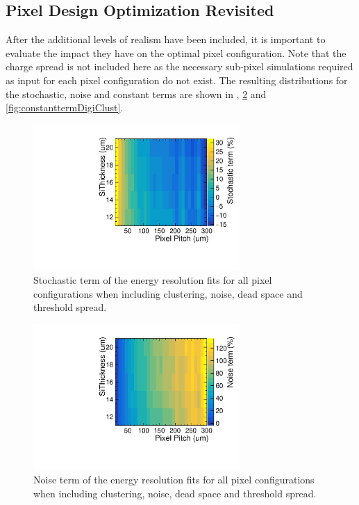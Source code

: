\subsection{Pixel Design Optimization Revisited}

After the additional levels of realism have been included, it is important to evaluate the impact they have on the optimal pixel configuration. Note that the charge spread is not included here as the necessary sub-pixel simulations required as input for each pixel configuration do not exist. The resulting distributions for the stochastic, noise and constant terms are shown in  , \ref{fig:noisetermDigiClust} and \ref{fig:constanttermDigiClust}.

\begin{figure}
  \centering
  \includegraphics[width=0.7\textwidth,keepaspectratio]{DECALStudies/fig/FullDigiStochastic.pdf}
  \caption{Stochastic term of the energy resolution fits for all pixel configurations when including clustering, noise, dead space and threshold spread.}
  \label{fig:stochastictermDigiClust}
\end{figure}
\begin{figure}
  \centering
  \includegraphics[width=0.7\textwidth,keepaspectratio]{DECALStudies/fig/FullDigiNoise.pdf}
  \caption{Noise term of the energy resolution fits for all pixel configurations when including clustering, noise, dead space and threshold spread.}
  \label{fig:noisetermDigiClust}
\end{figure}

